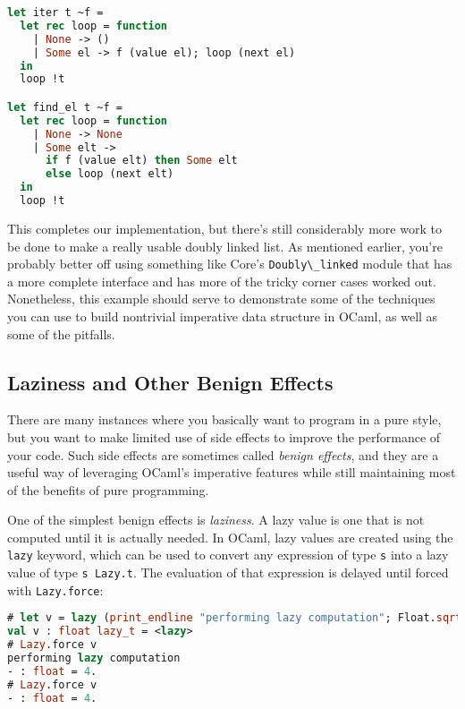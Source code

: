 \begin{lstlisting}[language=Caml]
let iter t ~f =
  let rec loop = function
    | None -> ()
    | Some el -> f (value el); loop (next el)
  in
  loop !t

let find_el t ~f =
  let rec loop = function
    | None -> None
    | Some elt ->
      if f (value elt) then Some elt
      else loop (next elt)
  in
  loop !t
\end{lstlisting}

This completes our implementation, but there's still considerably more
work to be done to make a really usable doubly linked list. As mentioned
earlier, you're probably better off using something like Core's
\passthrough{\lstinline!Doubly\_linked!} module that has a more complete
interface and has more of the tricky corner cases worked out.
Nonetheless, this example should serve to demonstrate some of the
techniques you can use to build nontrivial imperative data structure in
OCaml, as well as some of the pitfalls.~

\hypertarget{laziness-and-other-benign-effects}{%
\subsection{Laziness and Other Benign
Effects}\label{laziness-and-other-benign-effects}}

There are many instances where you basically want to program in a pure
style, but you want to make limited use of side effects to improve the
performance of your code. Such side effects are sometimes called
\emph{benign effects}, and they are a useful way of leveraging OCaml's
imperative features while still maintaining most of the benefits of pure
programming. 

One of the simplest benign effects is \emph{laziness}. A lazy value is
one that is not computed until it is actually needed. In OCaml, lazy
values are created using the \passthrough{\lstinline!lazy!} keyword,
which can be used to convert any expression of type
\passthrough{\lstinline!s!} into a lazy value of type
\passthrough{\lstinline!s Lazy.t!}. The evaluation of that expression is
delayed until forced with \passthrough{\lstinline!Lazy.force!}:

\begin{lstlisting}[language=Caml]
# let v = lazy (print_endline "performing lazy computation"; Float.sqrt 16.)
val v : float lazy_t = <lazy>
# Lazy.force v
performing lazy computation
- : float = 4.
# Lazy.force v
- : float = 4.
\end{lstlisting}


